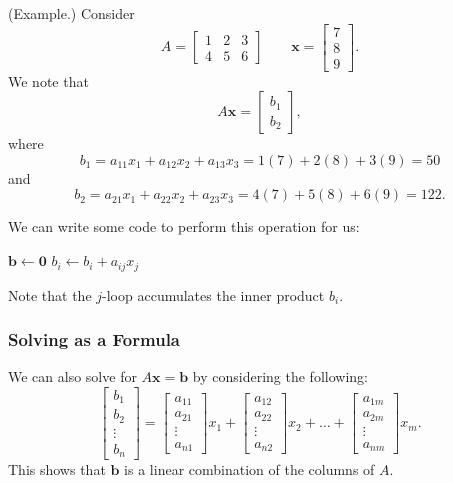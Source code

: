 \documentclass[letterpaper]{article}
\begin{document}
\begin{mdframed}
    (Example.) Consider
    \[A = \begin{bmatrix}
        1 & 2 & 3 \\ 
        4 & 5 & 6
    \end{bmatrix} \qquad \mathbf{x} = \begin{bmatrix}
        7 \\ 8 \\ 9
    \end{bmatrix}.\]
    We note that 
    \[A\mathbf{x} = \begin{bmatrix}
        b_1 \\ 
        b_2
    \end{bmatrix},\]
    where 
    \[b_1 = a_{11}x_1 + a_{12}x_2 + a_{13}x_3 = 1(7) + 2(8) + 3(9) = 50\]
    and 
    \[b_2 = a_{21}x_1 + a_{22}x_2 + a_{23}x_3 = 4(7) + 5(8) + 6(9) = 122.\]
\end{mdframed}
We can write some code to perform this operation for us:
\begin{algorithmic}
    \State $\mathbf{b} \gets \mathbf{0}$
            \State $b_i \gets b_i + a_{ij} x_j$
        \EndFor
    \EndFor
\end{algorithmic}
Note that the $j$-loop accumulates the inner product $b_i$. 
    
\subsubsection{Solving as a Formula}
We can also solve for $A\mathbf{x} = \mathbf{b}$ by considering the following:
\[\begin{bmatrix}
    b_1 \\ b_2 \\ \vdots \\ b_n 
\end{bmatrix} = \begin{bmatrix}
    a_{11} \\ a_{21} \\ \vdots \\ a_{n1}
\end{bmatrix} x_1 + \begin{bmatrix}
    a_{12} \\ a_{22} \\ \vdots \\ a_{n2}
\end{bmatrix} x_2 + \hdots + \begin{bmatrix}
    a_{1m} \\ a_{2m} \\ \vdots \\ a_{nm}
\end{bmatrix} x_m.\]
This shows that $\mathbf{b}$ is a linear combination of the columns of $A$. 
\end{document}
